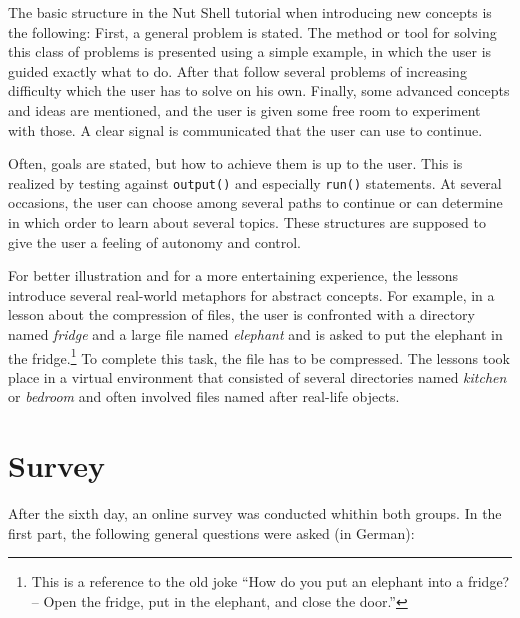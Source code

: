 \documentclass[paper=a4,twoside,abstract=on,cleardoublepage=empty,numbers=noenddot,toc=bib,toc=listof,12pt,appendixprefix=true]{scrreprt}
\begin{document}
The basic structure in the Nut Shell tutorial when introducing new concepts is the following: First, a general problem is stated. The method or tool for solving this class of problems is presented using a simple example, in which the user is guided exactly what to do. After that follow several problems of increasing difficulty which the user has to solve on his own. Finally, some advanced concepts and ideas are mentioned, and the user is given some free room to experiment with those. A clear signal is communicated that the user can use to continue.

Often, goals are stated, but how to achieve them is up to the user. This is realized by testing against \texttt{output()} and especially \texttt{run()} statements. At several occasions, the user can choose among several paths to continue or can determine in which order to learn about several topics. These structures are supposed to give the user a feeling of autonomy and control.

For better illustration and for a more entertaining experience, the lessons introduce several real-world metaphors for abstract concepts. For example, in a lesson about the compression of files, the user is confronted with a directory named \textit{fridge} and a large file named \textit{elephant} and is asked to put the elephant in the fridge.\footnote{This is a reference to the old joke “How do you put an elephant into a fridge? -- Open the fridge, put in the elephant, and close the door.”} To complete this task, the file has to be compressed. The lessons took place in a virtual environment that consisted of several directories named \emph{kitchen} or \emph{bedroom} and often involved files named after real-life objects.

\section{Survey}

After the sixth day, an online survey was conducted whithin both groups. In the first part, the following general questions were asked (in German):
\end{document}
